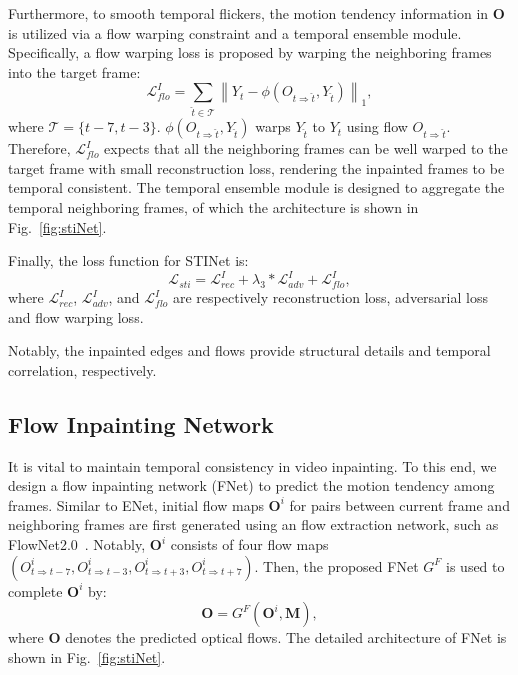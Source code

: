 
Furthermore, to smooth temporal flickers, the motion tendency information in $\boldsymbol{O}$ is utilized via a flow warping constraint and a temporal ensemble module.
Specifically, a flow warping loss is proposed by warping the neighboring frames into the target frame:
\begin{equation}
	\label{eq:inp_flow}
	\mathcal{L}^I_{flo}=\sum_{\widehat{t}\in\mathcal{T}}\left\| Y_t-\phi(O_{t\Rightarrow \widehat{t}},Y_{\widehat{t}}) \right\|_1,
\end{equation}
where $\mathcal{T}=\{t-7,t-3\}$. $\phi(O_{t\Rightarrow \widehat{t}},Y_{\widehat{t}})$ warps $Y_{\widehat{t}}$ to $Y_{t}$ using flow $O_{t\Rightarrow \widehat{t}}$.
Therefore, $\mathcal{L}^I_{flo}$ expects that all the neighboring frames can be well warped to the target frame with small reconstruction loss, rendering the inpainted frames to be temporal consistent.
The temporal ensemble module is designed to aggregate the temporal neighboring frames, of which the architecture is shown in Fig.~\ref{fig:stiNet}.


Finally, the loss function for STINet is:
\begin{equation}
	\label{eq:inpain_all}
	\mathcal{L}_{sti}=\mathcal{L}^{I}_{rec}+\lambda_3 * \mathcal{L}^I_{adv}+ \mathcal{L}^I_{flo},
\end{equation}
where $\mathcal{L}^{I}_{rec}$, $\mathcal{L}^I_{adv}$, and $\mathcal{L}^I_{flo}$ are respectively reconstruction loss, adversarial loss and flow warping loss.

Notably, the inpainted edges and flows provide structural details and temporal correlation, respectively. 





\subsection{Flow Inpainting Network}

It is vital to maintain temporal consistency in video inpainting.
To this end, we design a flow inpainting network (FNet) to predict the motion tendency among frames.
%
Similar to ENet, initial flow maps \(\boldsymbol{O}^i\) for pairs between current frame and neighboring frames are first generated using an flow extraction network, such as FlowNet2.0~\cite{Flownet_2017_CVPR}.
Notably, \(\boldsymbol{O}^i\) consists of four flow maps \((O^i_{t\Rightarrow t-7}, O^i_{t\Rightarrow t-3}, O^i_{t\Rightarrow t+3}, O^i_{t\Rightarrow t+7})\).
Then, the proposed FNet $G^F$ is used to complete \(\boldsymbol{O}^i\) by:
\begin{equation}
	\label{eq:flownet}
	\boldsymbol{O}=G^F(\boldsymbol{O}^{i},\boldsymbol{M}),
\end{equation}
where $\boldsymbol{O}$ denotes the predicted optical flows.
%
The detailed architecture of FNet is shown in Fig.~\ref{fig:stiNet}.

